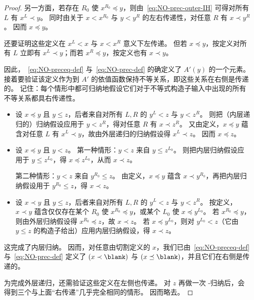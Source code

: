 \begin{proof}
  另一方面，若存在 $R_0$ 使 $x^{R_0}\preceq y$，则由~\eqref{eq:NO-prec-outer-IH} 可得对所有 $L$ 有 $x^L \prec y$。
  同时由关于 $x<x^{R_0}$ 与 $y<y^R$ 的左右传递性，对任意 $R$ 有 $x\prec y^R$。
  因而 $x\preceq y$。

  还要证明这些定义在 $x^L<x$ 与 $x<x^R$ 意义下左传递。
  但若 $x\preceq y$，按定义对所有 $L$ 立即有 $x^L\prec y$；而若 $x^R\preceq y$，按定义也有 $x\prec y$。

  因此，~\eqref{eq:NO-preceq-def} 与~\eqref{eq:NO-prec-def} 的确定义了 $A'(y)$ 的一个元素。
  接着要验证该定义作为到 $A'$ 的依值函数保持不等关系，即这些关系在右侧是传递的。
  记住：每个情形中都可归纳地假设它们对于不等式构造子输入中出现的所有不等关系都具右传递性。
  \begin{itemize}
  \item 设 $x\preceq y$ 且 $y\le z$，后者来自对所有 $L,R$ 的 $y^L<z$ 与 $y<z^R$。
    则把（内层递归的）归纳假设应用于 $y<z^R$，得对任意 $R$ 有 $x\prec z^R$。
    又由定义，$x\preceq y$ 蕴含对任意 $L$ 有 $x^L \prec y$，故由外层递归的归纳假设得 $x^L \prec z$。
    因而 $x\preceq z$。
  \item 设 $x\preceq y$ 且 $y<z$。
    第一种情形：$y<z$ 来自 $y\le z^{L_0}$。
    则把内层归纳假设应用于 $y\le z^{L_0}$，得 $x \preceq z^{L_0}$，从而 $x\prec z$。

    第二种情形：$y<z$ 来自 $y^{R_0}\le z$。
    由定义，$x\preceq y$ 蕴含 $x\prec y^{R_0}$，再把内层归纳假设用于 $y^{R_0}\le z$，得 $x\prec z$。
  \item 设 $x\prec y$ 且 $y\le z$，后者来自对所有 $L,R$ 的 $y^L<z$ 与 $y<z^R$。
    按定义，$x\prec y$ 蕴含仅仅存在某个 $R_0$ 使 $x^{R_0}\preceq y$，或某个 $L_0$ 使 $x\preceq y^{L_0}$。
    若 $x^{R_0}\preceq y$，则由外层归纳假设得 $x^{R_0}\preceq z$，故 $x\prec z$。
    若 $x\preceq y^{L_0}$，则对 $y^{L_0}<z$（它由 $y\le z$ 的构造子给出）应用内层归纳假设，得 $x\prec z$。

  \end{itemize}
  这完成了内层归纳。
  因而，对任意由切割定义的 $x$，我们已由~\eqref{eq:NO-preceq-def} 与~\eqref{eq:NO-prec-def} 定义了 $(x\prec \blank)$ 与 $(x\preceq \blank)$，并且它们在右侧是传递的。

  为完成外层递归，还需验证这些定义在左侧也传递。
  对 $z$ 再做一次 \NO-归纳后，会得到三个与上面“右传递”几乎完全相同的情形。
  因而略去。
\end{proof}

